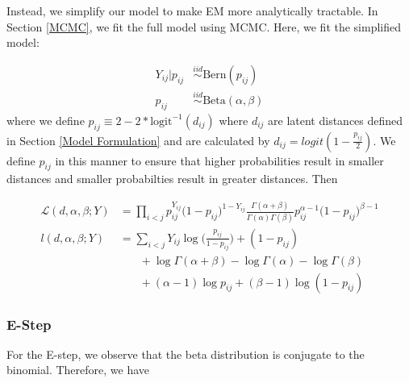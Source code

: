 \documentclass{article}
\begin{document}
Instead, we simplify our model to make EM more analytically tractable. In Section \ref{MCMC}, we fit the full model using MCMC. Here, we fit the simplified model:

\begin{align*}
Y_{ij} | p_{ij} &\overset{iid}\sim \text{Bern}(p_{ij}) \\
p_{ij} &\overset{iid}\sim \text{Beta}(\alpha, \beta)
\end{align*}
where we define $p_{ij} \equiv 2-2*\text{logit}^{-1} (d_{ij}) $ where $d_{ij}$ are latent distances defined in Section \ref{Model Formulation} and are calculated by $d_{ij} = logit(1 - \frac{p_{ij}}{2})$. We define $p_{ij}$ in this manner to ensure that higher probabilities result in smaller distances and smaller probabilties result in greater distances. Then

\begin{align*}
\mathcal{L}(d, \alpha, \beta; Y) &= \prod_{i<j}p_{ij}^{Y_{ij}}\big(1 - p_{ij}\big)^{1 - Y_{ij}} \frac{\Gamma(\alpha + \beta)}{\Gamma(\alpha)\Gamma(\beta)}p_{ij}^{\alpha - 1}\big(1-p_{ij}\big)^{\beta - 1} \\
l(d, \alpha, \beta ; Y) &= \sum_{i<j} Y_{ij}\log \Big(\frac{p_{ij}}{1 - p_{ij}}\Big) + (1-p_{ij})  \\
&\ \ \ \ \ \ \ \ + \log \Gamma(\alpha + \beta) - \log \Gamma(\alpha) - \log \Gamma(\beta) \\
&\ \ \ \ \ \ \ \ + (\alpha - 1)\log p_{ij} + (\beta - 1)\log(1 - p_{ij})
\end{align*}


\subsubsection{E-Step}

For the E-step, we observe that the beta distribution is conjugate to the binomial. Therefore, we have
\end{document}
